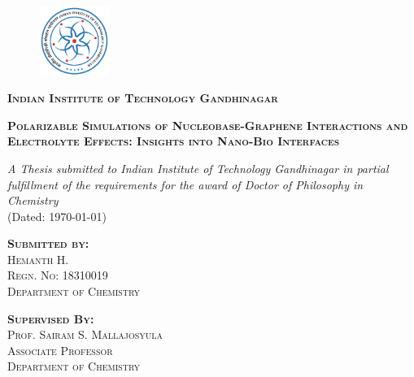 \documentclass[11pt, twoside, oldfontcommands]{memoir}
\begin{document}
    \begin{titlingpage}
        \begin{figure}
            \centering
            \includegraphics[width=0.2\textwidth]{iitgnlogo-emblem.png}
        \end{figure}
        \vspace{2em}
        \begin{center}
            \large\scshape\textbf{Indian Institute of Technology Gandhinagar}
        \end{center}
        \vspace{3em}
        \begin{center}
            \Large\scshape\textbf{Polarizable Simulations of Nucleobase-Graphene Interactions and Electrolyte Effects: Insights into Nano-Bio Interfaces}
        \end{center}
        \vspace{1em}
        \begin{center}
            \textit{A Thesis submitted to Indian Institute of Technology Gandhinagar in partial fulfillment of the requirements for the award of Doctor of Philosophy in Chemistry}\\
            (Dated: \today)
        \end{center}
        \vspace{3em}
        \begin{center}
            \large\scshape
            \textbf{Submitted by:}\\
            Hemanth H.\\
            Regn. No: 18310019\\
            Department of Chemistry
        \end{center}
        \vspace{1em}
        \begin{center}
            \large\scshape
            \textbf{Supervised By:}\\
            Prof. Sairam S. Mallajosyula\\
            Associate Professor\\
            Department of Chemistry
        \end{center}
    \end{titlingpage}
\end{document}

